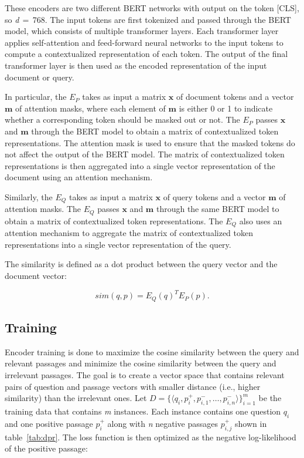 These encoders are two different BERT networks with output on the token [CLS], so \emph{d}\,$=$\,768. The input tokens are first tokenized and passed through the BERT model, which consists of multiple transformer layers. Each transformer layer applies self-attention and feed-forward neural networks to the input tokens to compute a contextualized representation of each token. The output of the final transformer layer is then used as the encoded representation of the input document or query.

In particular, the $E_P$ takes as input a matrix $\mathbf{x}$ of document tokens and a vector $\mathbf{m}$ of attention masks, where each element of $\mathbf{m}$ is either 0 or 1 to indicate whether a corresponding token should be masked out or not. The $E_P$ passes $\mathbf{x}$ and $\mathbf{m}$ through the BERT model to obtain a matrix of contextualized token representations. The attention mask is used to ensure that the masked tokens do not affect the output of the BERT model. The matrix of contextualized token representations is then aggregated into a single vector representation of the document using an attention mechanism.

Similarly, the $E_Q$ takes as input a matrix $\mathbf{x}$ of query tokens and a vector $\mathbf{m}$ of attention masks. The $E_Q$ passes $\mathbf{x}$ and $\mathbf{m}$ through the same BERT model to obtain a matrix of contextualized token representations. The $E_Q$ also uses an attention mechanism to aggregate the matrix of contextualized token representations into a single vector representation of the query.

The similarity is defined as a dot product between the query vector and the document vector:

\begin{equation}
    sim(q, p) = E_Q(q)^TE_P(p).
\end{equation}

\subsection*{Training}
Encoder training is done to maximize the cosine similarity between the query and relevant passages and minimize the cosine similarity between the query and irrelevant passages. The goal is to create a vector space that contains relevant pairs of question and passage vectors with smaller distance (i.e., higher similarity) than the irrelevant ones. Let $D = \{\langle q_i, p_i^+, p_{i,1}^-, \dots , p_{i,n}^-\rangle\}_{i=1}^m$ be the training data that contains \emph{m} instances. Each instance contains one question $q_i$ and one positive passage $p_i^+$ along with \emph{n} negative passages $p_{i,j}^+$ shown in table~\ref{tab:dpr}. The loss function is then optimized as the negative log-likelihood of the positive passage:

